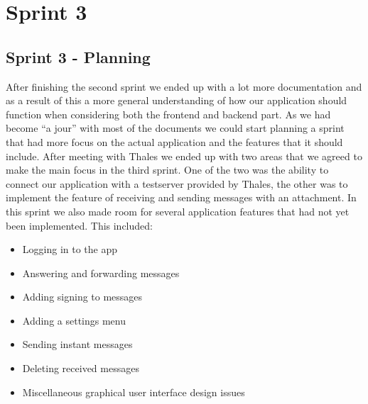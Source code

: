 \chapter{Sprint 3}

\section{Sprint 3 - Planning}
After finishing the second sprint we ended up with a lot more documentation and as a result of this a more general understanding of how our application should function when considering both the frontend and backend part. As we had become “a jour” with most of the documents we could start planning a sprint that had more focus on the actual application and the features that it should include. 
\newline
\newline
After meeting with Thales we ended up with two areas that we agreed to make the main focus in the third sprint. One of the two was the ability to connect our application with a testserver provided by Thales, the other was to implement the feature of receiving and sending messages with an attachment.
\newline
\newline
In this sprint we also made room for several application features that had not yet been implemented. This included:
\begin{itemize}
\item{}Logging in to the app
\item{}Answering and forwarding messages
\item{}Adding signing to messages
\item{}Adding a settings menu
\item{}Sending instant messages
\item{}Deleting received messages
\item{}Miscellaneous graphical user interface design issues
\end{itemize}

